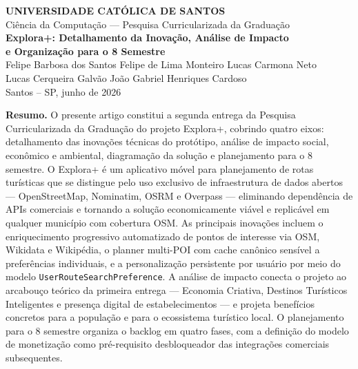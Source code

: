 \documentclass[12pt, a4paper]{article}
\begin{document}
\begin{center}
  {\large\bfseries UNIVERSIDADE CAT\'OLICA DE SANTOS}\\[0.2cm]
  {\normalsize Ci\^encia da Computa\c{c}\~ao --- Pesquisa Curricularizada da Gradua\c{c}\~ao}\\[1.4cm]

  {\Large\bfseries Explora+: Detalhamento da Inova\c{c}\~ao, An\'alise de Impacto\\
  e Organiza\c{c}\~ao para o 8\textordmasculine{} Semestre}\\[1.2cm]

  {\normalsize
    Felipe Barbosa dos Santos\quad
    Felipe de Lima Monteiro\quad
    Lucas Carmona Neto\\[0.3cm]
    Lucas Cerqueira Galv\~ao\quad
    Jo\~ao Gabriel Henriques Cardoso
  }\\[0.6cm]

  {\normalsize Santos -- SP, junho de 2026}
\end{center}

\vspace{1.0cm}

\noindent\textbf{Resumo.} O presente artigo constitui a segunda entrega da Pesquisa Curricularizada da Gradua\c{c}\~ao do projeto Explora+, cobrindo quatro eixos: detalhamento das inova\c{c}\~oes t\'ecnicas do prot\'otipo, an\'alise de impacto social, econ\^omico e ambiental, diagrama\c{c}\~ao da solu\c{c}\~ao e planejamento para o 8\textordmasculine{} semestre. O Explora+ \'e um aplicativo m\'ovel para planejamento de rotas tur\'isticas que se distingue pelo uso exclusivo de infraestrutura de dados abertos --- OpenStreetMap, Nominatim, OSRM e Overpass --- eliminando depend\^encia de APIs comerciais e tornando a solu\c{c}\~ao economicamente vi\'avel e replicável em qualquer munic\'ipio com cobertura OSM. As principais inova\c{c}\~oes incluem o enriquecimento progressivo automatizado de pontos de interesse via OSM, Wikidata e Wikip\'edia, o planner multi-POI com cache can\^onico sensível a prefer\^encias individuais, e a personaliza\c{c}\~ao persistente por usu\'ario por meio do modelo \texttt{User\-Route\-Search\-Preference}. A an\'alise de impacto conecta o projeto ao arcabou\c{c}o te\'orico da primeira entrega --- Economia Criativa, Destinos Tur\'isticos Inteligentes e presença digital de estabelecimentos --- e projeta benef\'icios concretos para a popula\c{c}\~ao e para o ecossistema tur\'istico local. O planejamento para o 8\textordmasculine{} semestre organiza o backlog em quatro fases, com a defini\c{c}\~ao do modelo de monetiza\c{c}\~ao como pr\'e-requisito desbloqueador das integra\c{c}\~oes comerciais subsequentes.
\end{document}
